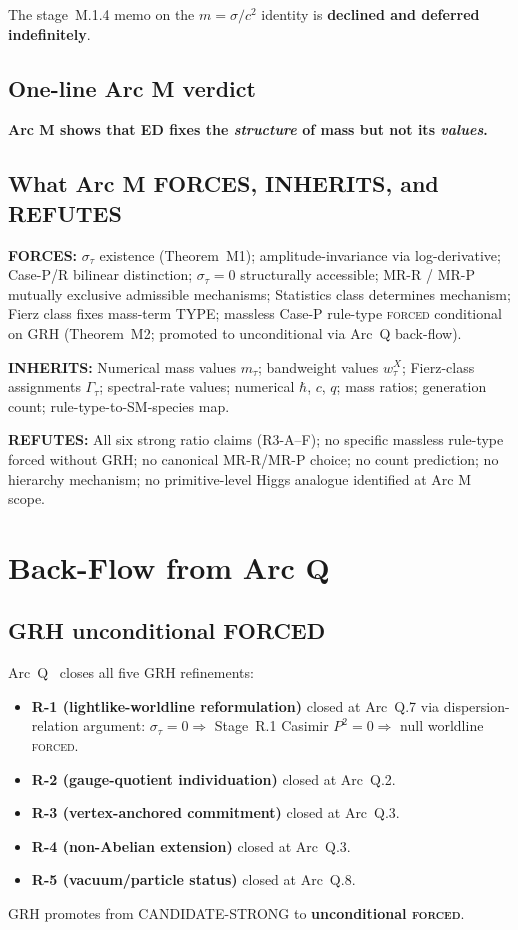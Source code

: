 \documentclass[11pt,a4paper]{article}
\begin{document}
The stage~M.1.4 memo on the $m = \sigma/c^2$ identity is \textbf{declined and deferred indefinitely}.

\subsection{One-line Arc M verdict}

\begin{center}
\textbf{Arc M shows that ED fixes the \emph{structure} of mass but not its \emph{values}.}
\end{center}

\subsection{What Arc M FORCES, INHERITS, and REFUTES}

\textbf{FORCES:} $\sigma_\tau$ existence (Theorem~M1); amplitude-invariance via log-derivative; Case-P/R bilinear distinction; $\sigma_\tau = 0$ structurally accessible; MR-R / MR-P mutually exclusive admissible mechanisms; Statistics class determines mechanism; Fierz class fixes mass-term TYPE; massless Case-P rule-type \textsc{forced} conditional on GRH (Theorem~M2; promoted to unconditional via Arc~Q back-flow).

\textbf{INHERITS:} Numerical mass values $m_\tau$; bandweight values $w_\tau^X$; Fierz-class assignments $\Gamma_\tau$; spectral-rate values; numerical $\hbar$, $c$, $q$; mass ratios; generation count; rule-type-to-SM-species map.

\textbf{REFUTES:} All six strong ratio claims (R3-A--F); no specific massless rule-type forced without GRH; no canonical MR-R/MR-P choice; no count prediction; no hierarchy mechanism; no primitive-level Higgs analogue identified at Arc M scope.

\section{Back-Flow from Arc Q}

\subsection{GRH unconditional FORCED}

Arc~Q~\cite{arcq} closes all five GRH refinements:
\begin{itemize}
  \item \textbf{R-1 (lightlike-worldline reformulation)} closed at Arc~Q.7 via dispersion-relation argument: $\sigma_\tau = 0 \Rightarrow$ Stage~R.1 Casimir $P^2 = 0 \Rightarrow$ null worldline \textsc{forced}.
  \item \textbf{R-2 (gauge-quotient individuation)} closed at Arc~Q.2.
  \item \textbf{R-3 (vertex-anchored commitment)} closed at Arc~Q.3.
  \item \textbf{R-4 (non-Abelian extension)} closed at Arc~Q.3.
  \item \textbf{R-5 (vacuum/particle status)} closed at Arc~Q.8.
\end{itemize}
GRH promotes from CANDIDATE-STRONG to \textbf{unconditional \textsc{forced}}.
\end{document}
